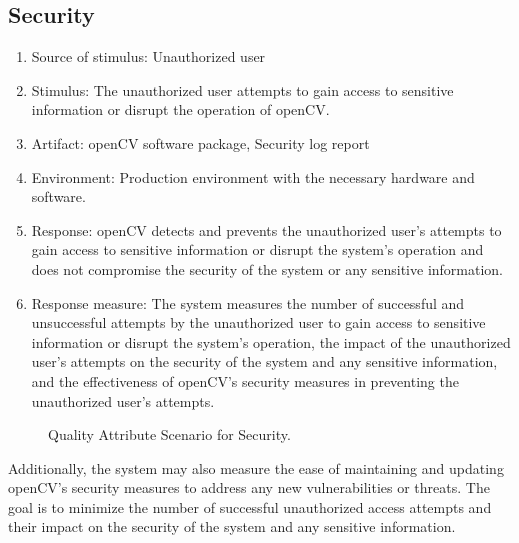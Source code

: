 \subsection{Security\label{subSection::SecurityQA}}
\begin{enumerate}
    \item Source of stimulus: Unauthorized user
    \item Stimulus: The unauthorized user attempts to gain access to sensitive information or disrupt the operation of openCV.
    \item Artifact: openCV software package, Security log report
    \item Environment: Production environment with the necessary hardware and software.
    \item Response: openCV detects and prevents the unauthorized user's attempts to gain access to sensitive information or disrupt the system's operation and does not compromise the security of the system or any sensitive information.
    \item Response measure: The system measures the number of successful and unsuccessful attempts by the unauthorized user to gain access to sensitive information or disrupt the system's operation, the impact of the unauthorized user's attempts on the security of the system and any sensitive information, and the effectiveness of openCV's security measures in preventing the unauthorized user's attempts.
\end{enumerate}
\begin{figure}[H]
\centering
{}
\caption{\label{Figure::Quality Attribute Scenario for Security} Quality Attribute Scenario for Security.}
\end{figure}
Additionally, the system may also measure the ease of maintaining and updating openCV's security measures to address any new vulnerabilities or threats. The goal is to minimize the number of successful unauthorized access attempts and their impact on the security of the system and any sensitive information.
